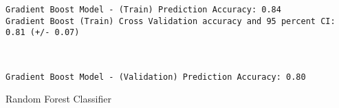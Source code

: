 \documentclass[11pt]{article}
\begin{document}
    \begin{Verbatim}[commandchars=\\\{\}]
Gradient Boost Model - (Train) Prediction Accuracy: 0.84
Gradient Boost (Train) Cross Validation accuracy and 95 percent CI: 0.81 (+/- 0.07)

    \end{Verbatim}

    \begin{center}
    \end{center}
    { \hspace*{\fill} \\}
    
    \begin{Verbatim}[commandchars=\\\{\}]
Gradient Boost Model - (Validation) Prediction Accuracy: 0.80

    \end{Verbatim}

    Random Forest Classifier
\end{document}
